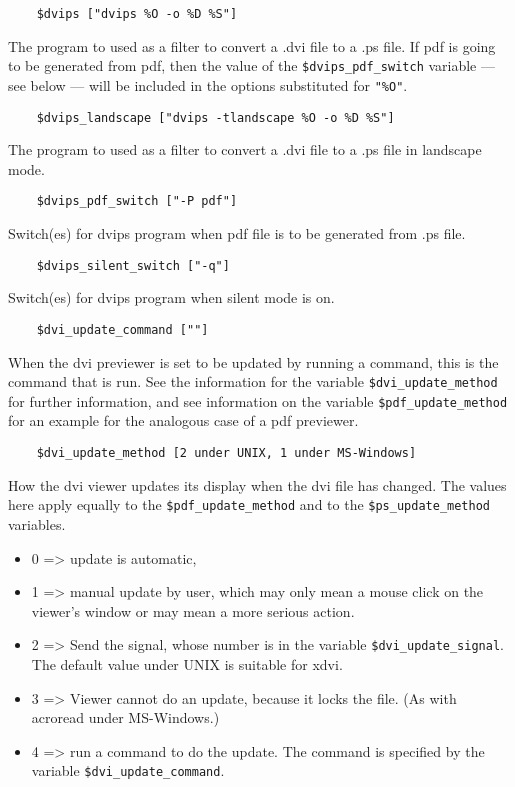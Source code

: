 \begin{verbatim}
	$dvips ["dvips %O -o %D %S"]
\end{verbatim}

The  program to used as a filter to convert a .dvi file to a .ps
file.  If pdf is going to be generated from pdf, then the  value of  the
\verb|$dvips_pdf_switch|  variable --- see below --- will be included in the
options substituted for \verb|"%O"|.

\begin{verbatim}
	$dvips_landscape ["dvips -tlandscape %O -o %D %S"]
\end{verbatim}

The program to used as a filter to convert a .dvi file to a  .ps
file in landscape mode.

\begin{verbatim}
	$dvips_pdf_switch ["-P pdf"]
\end{verbatim}

Switch(es)  for  dvips  program when pdf file is to be generated
from .ps file.

\begin{verbatim}
	$dvips_silent_switch ["-q"] 
\end{verbatim}

Switch(es) for dvips program when silent mode is on.

\begin{verbatim}
	$dvi_update_command [""]
\end{verbatim}

When the dvi previewer is set to be updated by  running  a  command,  this is
the command that is run.  See the information for the variable
\verb|$dvi_update_method| for further information, and see information  on  the
variable \verb|$pdf_update_method| for an example for the analogous case of a pdf
previewer.

\begin{verbatim}
	$dvi_update_method [2 under UNIX, 1 under MS-Windows]
\end{verbatim}

How the dvi viewer updates its display when  the  dvi  file  has
changed.    The  values  here  apply  equally  to  the  \verb|$pdf_update_method| and to the \verb|$ps_update_method| variables.

\begin{itemize}
\item 0 => update is automatic,
\item 1 => manual update by user, which may only mean a mouse click on the
				viewer's window or may mean a more serious action.

\item 2  =>  Send  the  signal,  whose  number  is in the variable
				\verb|$dvi_update_signal|.  The default value under  UNIX  is  suitable
								for xdvi.

\item 3  => Viewer cannot do an update, because it locks the file.  (As with
				acroread under MS-Windows.)

\item 4 => run a command to do the update. The command is  specified by the
				variable \verb|$dvi_update_command|.
\end{itemize}

